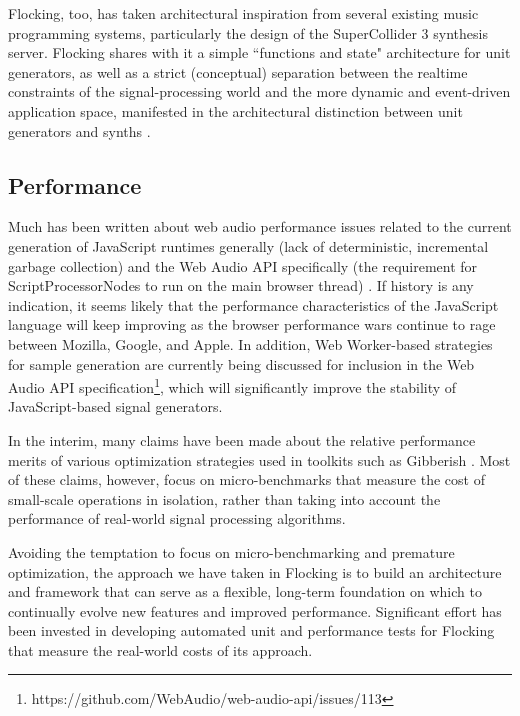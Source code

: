 \documentclass{article}
\begin{document}
Flocking, too, has taken architectural inspiration from several existing music programming systems, particularly the design of the SuperCollider 3 synthesis server. Flocking shares with it a simple ``functions and state" architecture for unit generators, as well as a strict (conceptual) separation between the realtime constraints of the signal-processing world and the more dynamic and event-driven application space, manifested in the architectural distinction between unit generators and synths \cite[pp. 64]{mccartney2002rethinking}.

\subsection{Performance}

Much has been written about web audio performance issues related to the current generation of JavaScript runtimes generally (lack of deterministic, incremental garbage collection) and the Web Audio API specifically (the requirement for ScriptProcessorNodes to run on the main browser thread) \cite{DBLP:journals/comj/WyseS13,roberts_web_2013}. If history is any indication, it seems likely that the performance characteristics of the JavaScript language will keep improving as the browser performance wars continue to rage between Mozilla, Google, and Apple. In addition, Web Worker-based strategies for sample generation are currently being discussed for inclusion in the Web Audio API specification\footnote{https://github.com/WebAudio/web-audio-api/issues/113}, which will significantly improve the stability of JavaScript-based signal generators.

In the interim, many claims have been made about the relative performance merits of various optimization strategies used in toolkits such as Gibberish \cite{roberts_web_2013}. Most of these claims, however, focus on micro-benchmarks that measure the cost of small-scale operations in isolation, rather than taking into account the performance of real-world signal processing algorithms.

Avoiding the temptation to focus on micro-benchmarking and premature optimization, the approach we have taken in Flocking is to build an architecture and framework that can serve as a flexible, long-term foundation on which to continually evolve new features and improved performance. Significant effort has been invested in developing automated unit and performance tests for Flocking that measure the real-world costs of its approach.
\end{document}
